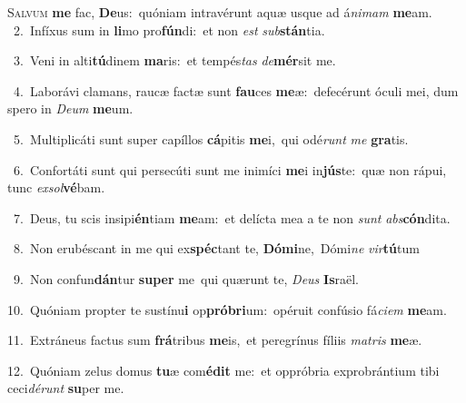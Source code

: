 \lettrine{\initial\textcolor{\initialcolor}{S}}{alvum} \textbf{me} fac, \textbf{De}\-us:~\star quóniam intravérunt aquæ usque ad á\-\textit{ni}\-\textit{mam} \textbf{me}\-am.\\
{\numbfont\textcolor{\numbcolor}{~2.}}~Infíxus sum in \textbf{li}\-mo pro\-\textbf{fún}\-di:~\star et non \textit{est} \textit{sub}\-\textbf{stán}tia.\par
{\numbfont\textcolor{\numbcolor}{~3.}}~Veni in alti\-\textbf{tú}\-dinem \textbf{ma}\-ris:~\star et tempés\textit{tas} \textit{de}\-\textbf{mér}sit me.\par
{\numbfont\textcolor{\numbcolor}{~4.}}~Laborávi clamans, raucæ factæ sunt \textbf{fau}\-ces \textbf{me}\-æ:~\star defecérunt óculi mei, dum spero in \textit{De}\-\textit{um} \textbf{me}\-um.\par
{\numbfont\textcolor{\numbcolor}{~5.}}~Multiplicáti sunt super capíllos \textbf{cá}\-pitis \textbf{me}\-i,~\star qui odé\textit{runt} \textit{me} \textbf{gra}\-tis.\par
{\numbfont\textcolor{\numbcolor}{~6.}}~Confortáti sunt qui persecúti sunt me inimíci \textbf{me}\-i in\-\textbf{jús}\-te:~\star quæ non rápui, tunc \textit{ex}\-\textit{sol}\textbf{vé}bam.\par
{\numbfont\textcolor{\numbcolor}{~7.}}~Deus, tu scis insipi\-\textbf{én}\-tiam \textbf{me}\-am:~\star et delícta mea a te non \textit{sunt} \textit{abs}\-\textbf{cón}dita.\par
{\numbfont\textcolor{\numbcolor}{~8.}}~Non erubéscant in me qui ex\-\textbf{spéc}\-tant te, \textbf{Dó}\-\textbf{mi}ne,~\star Dómi\textit{ne} \textit{vir}\-\textbf{tú}tum\par
{\numbfont\textcolor{\numbcolor}{~9.}}~Non confun\-\textbf{dán}\-tur \textbf{su}\-\textbf{per} me~\star qui quærunt te, \textit{De}\-\textit{us} \textbf{Is}\-raël.\par
{\numbfont\textcolor{\numbcolor}{10.}}~Quóniam propter te sustínu\textbf{i} op\-\textbf{pró}\-\textbf{bri}um:~\star opéruit confúsio fá\-\textit{ci}\-\textit{em} \textbf{me}\-am.\par
{\numbfont\textcolor{\numbcolor}{11.}}~Extráneus factus sum \textbf{frá}\-tribus \textbf{me}\-is,~\star et peregrínus fíliis \textit{ma}\-\textit{tris} \textbf{me}\-æ.\par
{\numbfont\textcolor{\numbcolor}{12.}}~Quóniam zelus domus \textbf{tu}\-æ com\-\textbf{é}\-\textbf{dit} me:~\star et oppróbria exprobrántium tibi ceci\-\textit{dé}\-\textit{runt} \textbf{su}\-per me.\par
